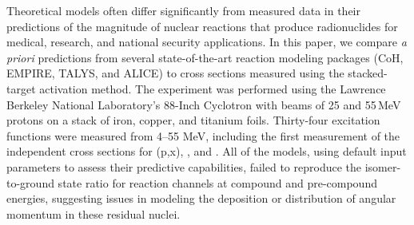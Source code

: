 


Theoretical models often differ significantly from measured data in their predictions of the magnitude of nuclear reactions that produce radionuclides for medical, research, and national security applications.
In this paper, we compare \emph{a priori} predictions from several state-of-the-art reaction modeling packages (CoH, EMPIRE, TALYS, and ALICE) to cross sections measured using the stacked-target activation method.  
The experiment was performed using the Lawrence Berkeley National Laboratory's 88-Inch Cyclotron with beams of 25 and 55\,MeV protons on a stack of 
iron, copper, and titanium foils.  
Thirty-four excitation functions were measured from 4--55 MeV, including the first measurement of the independent cross sections for (p,x), , and .  
All of the models, using default input parameters to assess their predictive capabilities,  failed to reproduce the isomer-to-ground state ratio for 
reaction channels at 
compound and pre-compound energies, suggesting issues in modeling the deposition or distribution of angular momentum in these residual nuclei.  



